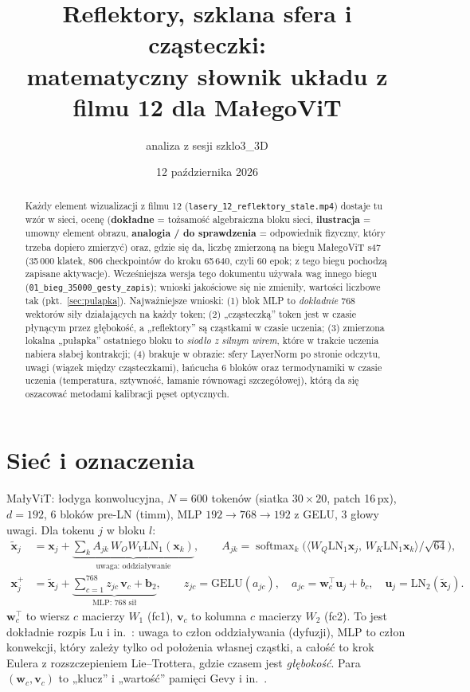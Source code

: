 \documentclass[a4paper,11pt]{article}
\title{Reflektory, szklana sfera i cząsteczki:\\ matematyczny słownik układu z filmu 12 dla MałegoViT}
\author{analiza z sesji szklo3\_3D}
\date{12 października 2026}
\newcommand{\DOK}{\textcolor{dok}{\textbf{dokładne}}}
\newcommand{\ILU}{\textcolor{ilu}{\textbf{ilustracja}}}
\newcommand{\ANA}{\textcolor{ana}{\textbf{analogia / do sprawdzenia}}}
\newcommand{\LN}{\mathrm{LN}}
\newcommand{\GELU}{\mathrm{GELU}}
\begin{document}
\maketitle
\sloppy

\begin{abstract}
Każdy element wizualizacji z filmu 12 (\texttt{lasery\_12\_reflektory\_stale.mp4}) dostaje tu wzór w sieci, ocenę
(\DOK{} = tożsamość algebraiczna bloku sieci, \ILU{} = umowny element obrazu, \ANA{} = odpowiednik fizyczny, który trzeba
dopiero zmierzyć) oraz, gdzie się da, liczbę zmierzoną na biegu MałegoViT s47 (35\,000 klatek, 806 checkpointów do kroku 65\,640,
czyli 60 epok; z tego biegu pochodzą zapisane aktywacje). Wcześniejsza wersja tego dokumentu używała wag innego biegu
(\texttt{01\_bieg\_35000\_gesty\_zapis}); wnioski jakościowe się nie zmieniły, wartości liczbowe tak (pkt.~\ref{sec:pulapka}).
Najważniejsze wnioski: (1) blok MLP to \emph{dokładnie} 768 wektorów siły działających na każdy token; (2) „cząsteczką” token jest
w czasie płynącym przez głębokość, a „reflektory” są cząstkami w czasie uczenia; (3) zmierzona lokalna „pułapka” ostatniego bloku
to \emph{siodło z silnym wirem}, które w trakcie uczenia nabiera słabej kontrakcji; (4) brakuje w obrazie: sfery LayerNorm po stronie
odczytu, uwagi (wiązek między cząsteczkami), łańcucha 6 bloków oraz termodynamiki w czasie uczenia (temperatura, sztywność,
łamanie równowagi szczegółowej), którą da się oszacować metodami kalibracji pęset optycznych.
\end{abstract}

\section{Sieć i oznaczenia}
MałyViT: łodyga konwolucyjna, $N=600$ tokenów (siatka $30\times20$, patch 16\,px), $d=192$, 6 bloków pre-LN (timm), MLP
$192\to768\to192$ z GELU, 3 głowy uwagi. Dla tokenu $j$ w bloku $l$:
\begin{align}
\tilde{\bm x}_j &= \bm x_j + \underbrace{\textstyle\sum_k A_{jk}\,W_O W_V \LN_1(\bm x_k)}_{\text{uwaga: oddziaływanie}},\qquad
A_{jk}=\operatorname{softmax}_k\!\big(\langle W_Q\LN_1\bm x_j,\,W_K\LN_1\bm x_k\rangle/\sqrt{64}\big),\label{eq:uwaga}\\
\bm x_j^{+} &= \tilde{\bm x}_j + \underbrace{\textstyle\sum_{c=1}^{768} z_{jc}\,\bm v_c + \bm b_2}_{\text{MLP: 768 sił}},\qquad
z_{jc}=\GELU(a_{jc}),\quad a_{jc}=\bm w_c^{\!\top}\bm u_j+b_c,\quad \bm u_j=\LN_2(\tilde{\bm x}_j).\label{eq:mlp}
\end{align}
$\bm w_c^{\!\top}$ to wiersz $c$ macierzy $W_1$ (fc1), $\bm v_c$ to kolumna $c$ macierzy $W_2$ (fc2). To jest dokładnie rozpis
Lu i in.~\cite{lu19}: uwaga to człon oddziaływania (dyfuzji), MLP to człon konwekcji, który zależy tylko od położenia własnej cząstki,
a całość to krok Eulera z rozszczepieniem Lie--Trottera, gdzie czasem jest \emph{głębokość}.
Para $(\bm w_c,\bm v_c)$ to „klucz” i „wartość” pamięci Gevy i in.~\cite{geva21}.
\end{document}
